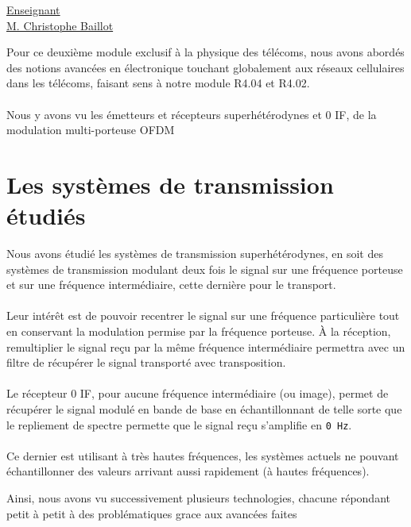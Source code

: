 \renewcommand{\figurename}{}

\vspace*{0.2cm}%
      \large
      \href{}{\color{black}Enseignant\\M. Christophe Baillot}\\%
      \normalsize
\vspace*{0.5cm}%

Pour ce deuxième module exclusif à la physique des télécoms, nous avons abordés des notions avancées en électronique touchant globalement aux réseaux cellulaires dans les télécoms, faisant sens à notre module R4.04 et R4.02.
\\ \\
Nous y avons vu les émetteurs et récepteurs superhétérodynes et 0 IF, de la modulation multi-porteuse OFDM

\section{Les systèmes de transmission étudiés}

Nous avons étudié les systèmes de transmission superhétérodynes, en soit des systèmes de transmission modulant deux fois le signal sur une fréquence porteuse et sur une fréquence intermédiaire, cette dernière pour le transport.
\\ \\
Leur intérêt est de pouvoir recentrer le signal sur une fréquence particulière tout en conservant la modulation permise par la fréquence porteuse. À la réception, remultiplier le signal reçu par la même fréquence intermédiaire permettra avec un filtre de récupérer le signal transporté avec transposition.
\\ \\
Le récepteur 0 IF, pour aucune fréquence intermédiaire (ou image), permet de récupérer le signal modulé en bande de base en échantillonnant de telle sorte que le repliement de spectre permette que le signal reçu s'amplifie en \texttt{0 Hz}.
\\ \\
Ce dernier est utilisant à très hautes fréquences, les systèmes actuels ne pouvant échantillonner des valeurs arrivant aussi rapidement (à hautes fréquences).

Ainsi, nous avons vu successivement plusieurs technologies, chacune répondant petit à petit à des problématiques grace aux avancées faites

